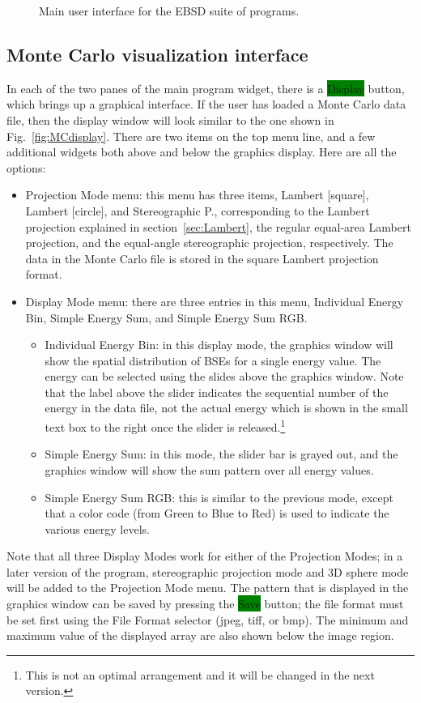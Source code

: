 \documentclass[DIV=calc, paper=letter, fontsize=11pt]{scrartcl}	 %
\newcommand{\button}[1]{\colorbox{green}{\textsf{#1}} button}
\begin{document}
\begin{figure}[t]
\leavevmode\centering
\epsfxsize=6in
\caption{\label{fig:EBSDmain}Main user interface for the EBSD suite of programs.}
\end{figure}

\subsection{Monte Carlo visualization interface\label{sec:idlMC}}
In each of the two panes of the main program widget, there is a \button{Display}, which brings up a graphical interface.  If the user has loaded a Monte Carlo data file, 
then the display window will look similar to the one shown in Fig.~\ref{fig:MCdisplay}.  There are two items on the top menu line, and a few additional widgets both 
above and below the graphics display.  Here are all the options:
\begin{itemize}
	\item \textsf{Projection Mode} menu:  this menu has three items, \textsf{Lambert [square]}, \textsf{Lambert [circle]}, and \textsf{Stereographic P.}, corresponding to the 
	Lambert projection explained in section~\ref{sec:Lambert}, the regular equal-area Lambert projection, and the equal-angle stereographic projection, respectively.  The data in the Monte Carlo
	file is stored in the square Lambert projection format.
	\item \textsf{Display Mode} menu: there are three entries in this menu, \textsf{Individual Energy Bin}, \textsf{Simple Energy Sum}, and \textsf{Simple Energy Sum RGB}.
	\begin{itemize}
		\item \textsf{Individual Energy Bin}: in this display mode, the graphics window will show the spatial distribution of BSEs for a single energy value.  The energy
		can be selected using the slides above the graphics window.  Note that the label above the slider indicates the sequential number of the energy in the 
		data file, not the actual energy which is shown in the small text box to the right once the slider is released.\footnote{This is not an optimal arrangement and 
		it will be changed in the next version.}
		\item \textsf{Simple Energy Sum}: in this mode, the slider bar is grayed out, and the graphics window will show the sum pattern over all energy values.  
		\item \textsf{Simple Energy Sum RGB}: this is similar to the previous mode, except that a color code (from Green to Blue to Red) 
		is used to indicate the various energy levels.
	\end{itemize}
\end{itemize}
Note that all three \textsf{Display Mode}s work for either of the \textsf{Projection Modes}; in a later version of the program, stereographic projection mode and 
3D sphere mode will be added to the \textsf{Projection Mode} menu.  The pattern that is displayed in the graphics window can be saved by pressing the 
\button{Save}; the file format must be set first using the File Format selector (jpeg, tiff, or bmp).  The minimum and maximum value of the displayed array
are also shown below the image region.
\end{document}
